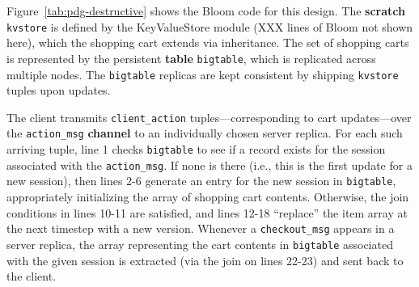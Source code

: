 Figure~\ref{tab:pdg-destructive} shows the Bloom code for this design.  The
\textbf{scratch} \texttt{kvstore} is defined by the KeyValueStore module (XXX
lines of Bloom not shown here), which the shopping cart extends via
inheritance.
The set of shopping carts is represented by the persistent \textbf{table} \texttt{bigtable}, which is replicated across multiple nodes.  The \texttt{bigtable} replicas are kept 
consistent by shipping \texttt{kvstore} tuples upon updates.



The client transmits \texttt{client\_action} tuples---corresponding to cart
updates---over the \texttt{action\_msg} \textbf{channel} to an individually
chosen server replica.  
For each such arriving
tuple, line 1 
checks \texttt{bigtable} to see if a record exists for the
session associated with the \texttt{action\_msg}.  If none is there (i.e., this
is the first update for a new session), then lines 2-6 generate an entry for
the new session in \texttt{bigtable}, appropriately initializing the array of
shopping cart contents.  Otherwise, the join conditions in lines 10-11 are
satisfied, and lines 12-18 ``replace'' the item array
at the next timestep with a new version.  
Whenever a \texttt{checkout\_msg} appears in a server replica, the array representing the cart contents in
\texttt{bigtable} associated with the given session is extracted (via the join
on lines 22-23) and sent back to the client.  

